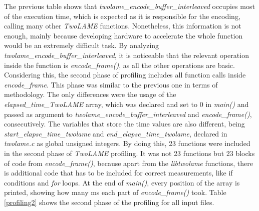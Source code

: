 \documentclass{article}
\begin{document}
The previous table shows that \textit{twolame\_encode\_buffer\_interleaved} occupies most of the execution time, which is expected as it is responsible for the encoding, calling many other \textit{TwoLAME} functions. Nonetheless, this information is not enough, mainly because developing hardware to accelerate the whole function would be an extremely difficult task.
By analyzing \textit{twolame\_encode\_buffer\_interleaved}, it is noticeable that the relevant operation inside the function is \textit{encode\_frame()}, as all the other operations are basic.
Considering this, the second phase of profiling includes all function calls inside \textit{encode\_frame}. 
This phase was similar to the previous one in terms of methodology. The only differences were the usage of the \textit{elapsed\_time\_\textit{TwoLAME}} array, which was declared and set to 0 in \textit{main()} and passed as argument to \textit{twolame\_encode\_buffer\_interleaved} and \textit{encode\_frame()}, consecutively. The variables that store the time values are also different, being \textit{start\_elapse\_time\_twolame} and \textit{end\_elapse\_time\_twolame}, declared in \textit{twolame.c} as global unsigned integers.
By doing this, 23 functions were included in the second phase of \textit{TwoLAME} profiling. It was not 23 functions but 23 blocks of code from \textit{encode\_frame()}, because apart from the \textit{libtwolame} functions, there is additional code that has to be included for correct measurements, like if conditions and \textit{for} loops.
At the end of \textit{main()}, every position of the array is printed, showing how many ms each part of \textit{encode\_frame()} took. 
Table \ref{profiling2} shows the second phase of the profiling for all input files.
\end{document}
